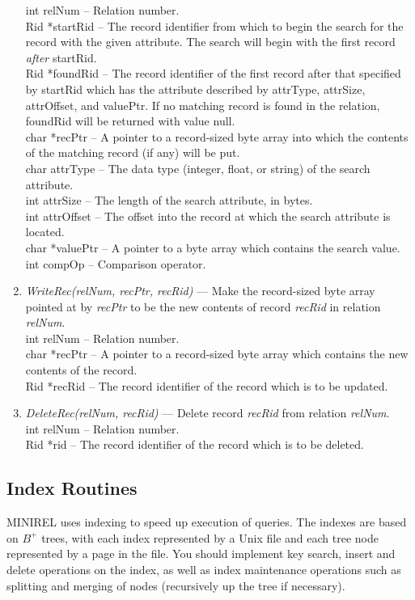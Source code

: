 \begin{enumerate}
int relNum -- Relation number.
\\
Rid *startRid -- The record identifier from which to begin the search for
the record with the given attribute.  The search will begin
with the first record \emph{after} startRid.
\\
Rid *foundRid -- The record identifier of
the first record after that specified by startRid which 
has the attribute described by attrType, attrSize, 
attrOffset, and valuePtr. If no matching record is found
in the relation, foundRid will be returned with value null.
\\
char *recPtr -- A pointer to a record-sized byte array into which the contents
of the matching record (if any) will be put.
\\
char attrType -- The data type (integer, float, or string)
of the search attribute.
\\
int attrSize -- The length of the search attribute, in bytes.
\\
int attrOffset -- The offset into the record at which the search
attribute is located.
\\
char *valuePtr -- A pointer to a byte array which contains
the search value.
\\
int compOp -- Comparison operator. 
\item
\emph{WriteRec(relNum, recPtr, recRid)} --- Make the record-sized
byte array pointed at by \emph{recPtr} to be the new contents of record
\emph{recRid} in relation \emph{relNum}.
\\
int relNum -- Relation number.
\\
char *recPtr -- A pointer to a record-sized byte array which contains the 
new contents of the record.
\\
Rid *recRid -- The record identifier of the record which is to be updated.
\item
\emph{DeleteRec(relNum, recRid)} --- Delete record \emph{recRid} from relation
\emph{relNum}.
\\
int relNum -- Relation number.
\\
Rid *rid -- The record identifier of the record which is to be deleted.
\end{enumerate}

\subsection{Index Routines}
MINIREL uses indexing to speed up execution of queries.  The indexes
are based on $B^+$ trees, with each index represented by a Unix file
and each tree node represented by a page in the file.  You should
implement key search, insert and delete operations on the index, as
well as index maintenance operations such as splitting and merging of
nodes (recursively up the tree if necessary).

